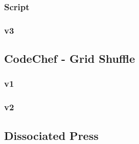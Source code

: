 \documentclass[../main.tex]{subfiles}
\begin{document}
\subsubsection{Script}


\subsubsection{v3}


\subsection{CodeChef - Grid Shuffle}

\subsubsection{v1}


\subsubsection{v2}


\subsection{Dissociated Press}

\end{document}
